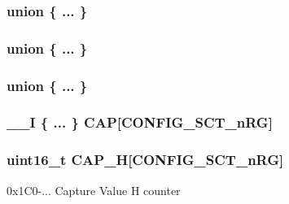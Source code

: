\subsubsection[{\texorpdfstring{"@38}{@38}}]{\setlength{\rightskip}{0pt plus 5cm}union \{ ... \} }\hypertarget{struct_l_p_c___s_c_t___t_afc740893d71d27f89a8f032024673844}{}\label{struct_l_p_c___s_c_t___t_afc740893d71d27f89a8f032024673844}
\subsubsection[{\texorpdfstring{"@40}{@40}}]{\setlength{\rightskip}{0pt plus 5cm}union \{ ... \} }\hypertarget{struct_l_p_c___s_c_t___t_a8ae38c47a6e20ae9ba58d490db71ff95}{}\label{struct_l_p_c___s_c_t___t_a8ae38c47a6e20ae9ba58d490db71ff95}
\subsubsection[{\texorpdfstring{"@42}{@42}}]{\setlength{\rightskip}{0pt plus 5cm}union \{ ... \} }\hypertarget{struct_l_p_c___s_c_t___t_a29edc63b54e5d2270be4fdac700536b7}{}\label{struct_l_p_c___s_c_t___t_a29edc63b54e5d2270be4fdac700536b7}
\subsubsection[{\texorpdfstring{C\+AP}{CAP}}]{\setlength{\rightskip}{0pt plus 5cm}\+\_\+\+\_\+I \{ ... \}   C\+AP\mbox{[}{\bf C\+O\+N\+F\+I\+G\+\_\+\+S\+C\+T\+\_\+n\+RG}\mbox{]}}\hypertarget{struct_l_p_c___s_c_t___t_a92757236fb3dba48ecfd8f81c3250db5}{}\label{struct_l_p_c___s_c_t___t_a92757236fb3dba48ecfd8f81c3250db5}
\subsubsection[{\texorpdfstring{C\+A\+P\+\_\+H}{CAP_H}}]{ uint16\+\_\+t C\+A\+P\+\_\+H\mbox{[}{\bf C\+O\+N\+F\+I\+G\+\_\+\+S\+C\+T\+\_\+n\+RG}\mbox{]}}\hypertarget{struct_l_p_c___s_c_t___t_a931b5b9bd76910b7bdad946486aa7e13}{}\label{struct_l_p_c___s_c_t___t_a931b5b9bd76910b7bdad946486aa7e13}
0x1\+C0-\/... Capture Value H counter 


